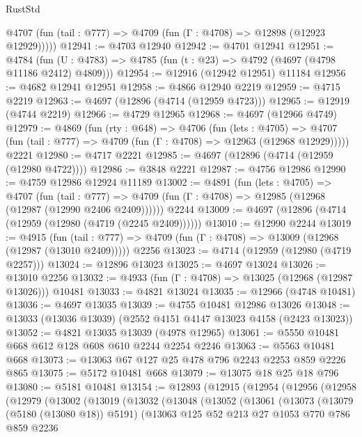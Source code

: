 \begin{lexlean}{RustStd}
\begin{coremodule}
      @4707 (fun (tail : @777) => @4709 (fun (Γ : @4708) => @12898 (@12923 @12929)))))
@12941 := @4703 @12940
@12942 := @4701 @12941
@12951 := @4784
    (fun (U : @4783) => @4785 (fun (t : @23) => @4792 (@4697 (@4798 @11186 @2412) @4809)))
@12954 := @12916 (@12942 @12951) @11184
@12956 := @4682 @12941 @12951
@12958 := @4866 @12940 @2219
@12959 := @4715 @2219
@12963 := @4697 (@12896 (@4714 (@12959 @4723)))
@12965 := @12919 (@4744 @2219)
@12966 := @4729 @12965
@12968 := @4697 (@12966 @4749)
@12979 := @4869
    (fun (rty : @648) =>
    @4706
      (fun (lets : @4705) =>
      @4707 (fun (tail : @777) => @4709 (fun (Γ : @4708) => @12963 (@12968 @12929)))))
    @2221
@12980 := @4717 @2221
@12985 := @4697 (@12896 (@4714 (@12959 (@12980 @4722))))
@12986 := @3848 @2221
@12987 := @4756 @12986
@12990 := @4759 @12986 @12924 @11189
@13002 := @4891
    (fun (lets : @4705) =>
    @4707
      (fun (tail : @777) =>
      @4709 (fun (Γ : @4708) => @12985 (@12968 (@12987 (@12990 @2406 @2409))))))
    @2244
@13009 := @4697 (@12896 (@4714 (@12959 (@12980 (@4719 (@2245 @2409))))))
@13010 := @12990 @2244
@13019 := @4915
    (fun (tail : @777) => @4709 (fun (Γ : @4708) => @13009 (@12968 (@12987 (@13010 @2409)))))
    @2256
@13023 := @4714 (@12959 (@12980 (@4719 @2257)))
@13024 := @12896 @13023
@13025 := @4697 @13024
@13026 := @13010 @2256
@13032 := @4933 (fun (Γ : @4708) => @13025 (@12968 (@12987 @13026))) @10481
@13033 := @4821 @13024
@13035 := @12966 (@4748 @10481)
@13036 := @4697 @13035
@13039 := @4755 @10481 @12986 @13026
@13048 := @13033 (@13036 @13039) (@2552 @4151 @4147 @13023 @4158 (@2423 @13023))
@13052 := @4821 @13035 @13039 (@4978 @12965)
@13061 := @5550 @10481 @668 @612 @128 @608 @610 @2244 @2254 @2246
@13063 := @5563 @10481 @668
@13073 := @13063 @67 @127 @25 @478 @796 @2243 @2253 @859 @2226 @865
@13075 := @5172 @10481 @668
@13079 := @13075 @18 @25 @18 @796
@13080 := @5181 @10481
@13154 := @12893
    (@12915
      (@12954
        (@12956
          (@12958
            (@12979
              (@13002
                (@13019
                  (@13032
                    (@13048
                      (@13052
                        (@13061
                          (@13073
                            (@13079 (@5180 (@13080 @18)) @5191)
                            (@13063
                              @125
                              @52
                              @213
                              @27
                              @1053
                              @770
                              @786
                              @859
                              @2236

\end{coremodule}
\end{lexlean}
